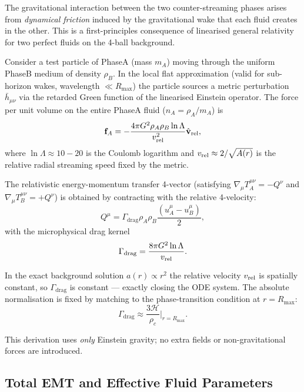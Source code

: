 \documentclass[10pt,twocolumn]{article}
\theoremstyle{definition}
\newcommand{\Rmax}{R_{\max}}
\newcommand{\rhoA}{\rho_{A}}
\newcommand{\rhoB}{\rho_{B}}
\newcommand{\Hcal}{\mathcal{H}}
\newcommand{\Gammadrag}{\Gamma_{\mathrm{drag}}}
\newcommand{\rhoc}{\rho_{c}}
\begin{document}
The gravitational interaction between the two counter-streaming phases arises from \emph{dynamical friction} induced by the gravitational wake that each fluid creates in the other. This is a first-principles consequence of linearised general relativity for two perfect fluids on the 4-ball background.

Consider a test particle of Phase\nobreakspace{}A (mass \(m_A\)) moving through the uniform Phase\nobreakspace{}B medium of density \(\rhoB\). In the local flat approximation (valid for sub-horizon wakes, wavelength \(\ll\Rmax\)) the particle sources a metric perturbation \(\bar{h}_{\mu\nu}\) via the retarded Green function of the linearised Einstein operator. The force per unit volume on the entire Phase\nobreakspace{}A fluid (\(n_A=\rhoA/m_A\)) is
\begin{equation}
  \mathbf{f}_A = -\frac{4\pi G^2\rhoA\rhoB\ln\Lambda}{v_{\rm rel}^2}\hat{\mathbf{v}}_{\rm rel},
\end{equation}
where \(\ln\Lambda\approx 10{-}20\) is the Coulomb logarithm and \(v_{\rm rel}\approx 2/\sqrt{A(r)}\) is the relative radial streaming speed fixed by the metric.

The relativistic energy-momentum transfer 4-vector (satisfying \(\nabla_\mu T_A^{\mu\nu}=-Q^\nu\) and \(\nabla_\mu T_B^{\mu\nu}=+Q^\nu\)) is obtained by contracting with the relative 4-velocity:
\begin{equation}
  Q^\mu = \Gammadrag\rhoA\rhoB\frac{(u_A^\mu-u_B^\mu)}{2},
  \label{eq:Q-micro}
\end{equation}
with the microphysical drag kernel
\begin{equation}
  \Gammadrag = \frac{8\pi G^2\ln\Lambda}{v_{\rm rel}}.
\end{equation}

In the exact background solution \(a(r)\propto r^2\) the relative velocity \(v_{\rm rel}\) is spatially constant, so \(\Gammadrag\) is constant — exactly closing the ODE system. The absolute normalisation is fixed by matching to the phase-transition condition at \(r=\Rmax\):
\begin{equation}
  \Gammadrag\approx\frac{3\Hcal}{\rhoc}\Big|_{r=\Rmax}.
\end{equation}

This derivation uses \emph{only} Einstein gravity; no extra fields or non-gravitational forces are introduced.





\subsection{Total EMT and Effective Fluid Parameters}
\end{document}
